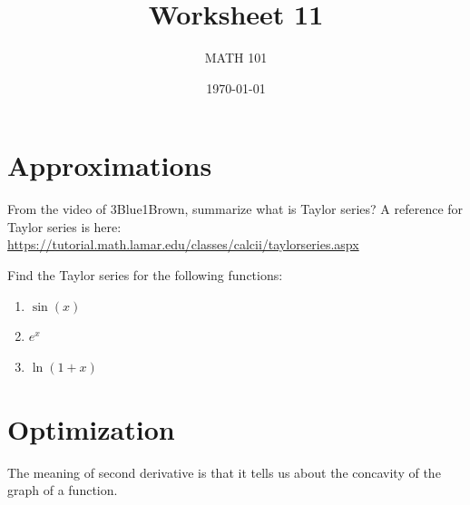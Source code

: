 \documentclass[12pt]{amsart}
\title{ Worksheet 11}
\author{MATH 101}
\date{\today}
\begin{document}
\maketitle

\section*{Approximations}

\begin{question}
	From the video of 3Blue1Brown, summarize what is Taylor series?
	A reference for Taylor series is here: \url{https://tutorial.math.lamar.edu/classes/calcii/taylorseries.aspx}
\end{question}

\vspace{7cm}

\begin{question}
	Find the Taylor series for the following functions:
	\begin{enumerate}
		\item $\sin(x)$
		      \vspace{5cm}
		\item $e^x$
		      \vspace{5cm}
		\item $\ln (1 + x) $
		      \vspace{5cm}
	\end{enumerate}
\end{question}



\newpage






\section*{Optimization}

The meaning of second derivative is that it tells us about the concavity of the graph of a function.
\end{document}
